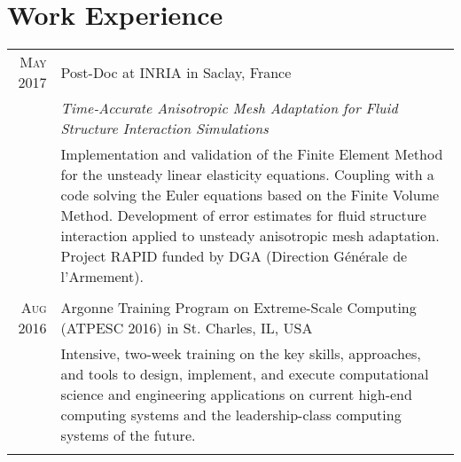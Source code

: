 \documentclass[a4paper,10pt]{article}
\begin{document}
\section{Work Experience}
\begin{tabular}{r|p{15cm}}

    \textsc{May 2017} & Post-Doc at \textsc{INRIA} in Saclay, France                                                                                               \\
                      & \emph{Time-Accurate Anisotropic Mesh Adaptation for Fluid Structure Interaction Simulations}                                               \\
                      & \footnotesize{Implementation and validation of the Finite Element Method for the unsteady linear elasticity equations.
        Coupling with a code solving the Euler equations based on the Finite Volume Method. Development of error estimates
        for fluid structure interaction applied to unsteady anisotropic mesh adaptation.
        Project RAPID funded by DGA (Direction G\'en\'erale de l'Armement). }                                                                                      \\
    \multicolumn{2}{c}{}                                                                                                                                           \\

    \textsc{Aug 2016} & Argonne Training Program on Extreme-Scale Computing (ATPESC 2016) in St. Charles, IL, USA                                                  \\
                      & \footnotesize{Intensive, two-week training on the key skills, approaches, and tools
        to design, implement, and execute computational science and engineering applications
        on current high-end computing systems and the leadership-class computing systems of the future.}                                                           \\
    \multicolumn{2}{c}{}                                                                                                                                           \\


\end{tabular}
\end{document}
